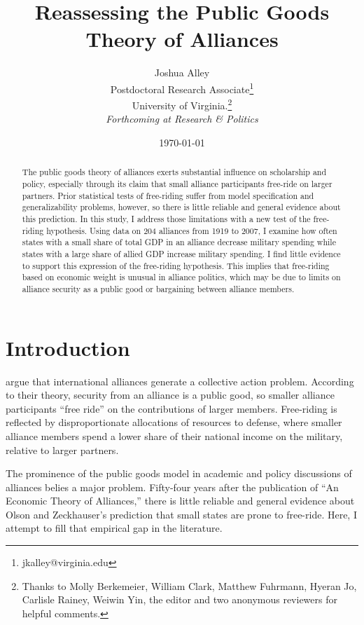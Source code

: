 \documentclass[12pt]{article}
\title{
\textbf{Reassessing the Public Goods Theory of Alliances}
	}
\author{Joshua Alley \\
Postdoctoral Research Associate\footnote{jkalley@virginia.edu} \\
University of Virginia.\thanks{Thanks to Molly Berkemeier, William Clark, Matthew Fuhrmann, Hyeran Jo, Carlisle Rainey, Weiwin Yin, the editor and two anonymous reviewers for helpful comments.} \\
\textit{Forthcoming at Research \& Politics}
}
\date{\today}
\begin{document}
\maketitle 

\doublespace

\begin{abstract}
The public goods theory of alliances exerts substantial influence on scholarship and policy, especially through its claim that small alliance participants free-ride on larger partners. 
Prior statistical tests of free-riding suffer from model specification and generalizability problems, however, so there is little reliable and general evidence about this prediction.
In this study, I address those limitations with a new test of the free-riding hypothesis. 
Using data on 204 alliances from 1919 to 2007, I examine how often states with a small share of total GDP in an alliance decrease military spending while states with a large share of allied GDP increase military spending. 
I find little evidence to support this expression of the free-riding hypothesis. 
This implies that free-riding based on economic weight is unusual in alliance politics, which may be due to limits on alliance security as a public good or bargaining between alliance members. 
\end{abstract} 

\newpage


\section{Introduction}



\citet{OlsonZeckhauser1966} argue that international alliances generate a collective action problem. 
According to their theory, security from an alliance is a public good, so smaller alliance participants ``free ride'' on the contributions of larger members. 
Free-riding is reflected by disproportionate allocations of resources to defense, where smaller alliance members spend a lower share of their national income on the military, relative to larger partners.


The prominence of the public goods model in academic and policy discussions of alliances belies a major problem.
Fifty-four years after the publication of ``An Economic Theory of Alliances,'' there is little reliable and general evidence about Olson and Zeckhauser's prediction that small states are prone to free-ride. 
Here, I attempt to fill that empirical gap in the literature. 
\end{document}
